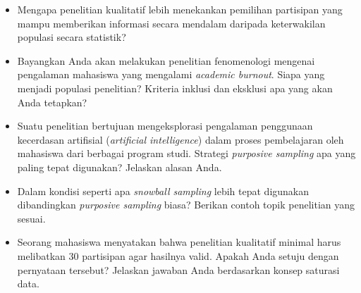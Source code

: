 \documentclass[
  indonesian,
  letterpaper,
  DIV=11,
  numbers=noendperiod]{scrreprt}
\providecommand{\tightlist}{%
  \setlength{\itemsep}{0pt}\setlength{\parskip}{0pt}}
\begin{document}
\begin{tcolorbox}[enhanced jigsaw, colframe=quarto-callout-important-color-frame, toptitle=1mm, breakable, leftrule=.75mm, arc=.35mm, toprule=.15mm, colback=white, colbacktitle=quarto-callout-important-color!10!white, bottomtitle=1mm, bottomrule=.15mm, titlerule=0mm, title=\textcolor{quarto-callout-important-color}{\faExclamation}\hspace{0.5em}{Refleksi \& Diskusi}, coltitle=black, left=2mm, opacitybacktitle=0.6, opacityback=0, rightrule=.15mm]

\begin{itemize}
\tightlist
\item
  Mengapa penelitian kualitatif lebih menekankan pemilihan partisipan
  yang mampu memberikan informasi secara mendalam daripada keterwakilan
  populasi secara statistik?
\item
  Bayangkan Anda akan melakukan penelitian fenomenologi mengenai
  pengalaman mahasiswa yang mengalami \emph{academic burnout}. Siapa
  yang menjadi populasi penelitian? Kriteria inklusi dan eksklusi apa
  yang akan Anda tetapkan?
\item
  Suatu penelitian bertujuan mengeksplorasi pengalaman penggunaan
  kecerdasan artifisial (\emph{artificial intelligence}) dalam proses
  pembelajaran oleh mahasiswa dari berbagai program studi. Strategi
  \emph{purposive sampling} apa yang paling tepat digunakan? Jelaskan
  alasan Anda.
\item
  Dalam kondisi seperti apa \emph{snowball sampling} lebih tepat
  digunakan dibandingkan \emph{purposive sampling} biasa? Berikan contoh
  topik penelitian yang sesuai.
\item
  Seorang mahasiswa menyatakan bahwa penelitian kualitatif minimal harus
  melibatkan 30 partisipan agar hasilnya valid. Apakah Anda setuju
  dengan pernyataan tersebut? Jelaskan jawaban Anda berdasarkan konsep
  saturasi data.
\end{itemize}

\end{tcolorbox}
\end{document}
